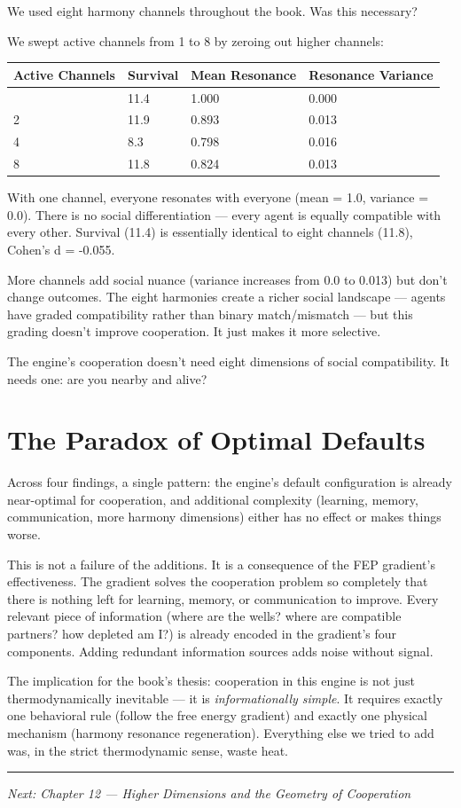 We used eight harmony channels throughout the book. Was this necessary?

We swept active channels from 1 to 8 by zeroing out higher channels:

\begin{longtable}[]{@{}llll@{}}
\toprule\noalign{}
Active Channels & Survival & Mean Resonance & Resonance Variance \\
\midrule\noalign{}
\endhead
\bottomrule\noalign{}
\endlastfoot
1 & 11.4 & 1.000 & 0.000 \\
2 & 11.9 & 0.893 & 0.013 \\
4 & 8.3 & 0.798 & 0.016 \\
8 & 11.8 & 0.824 & 0.013 \\
\end{longtable}

With one channel, everyone resonates with everyone (mean = 1.0, variance = 0.0). There is no social differentiation --- every agent is equally compatible with every other. Survival (11.4) is essentially identical to eight channels (11.8), Cohen's d = -0.055.

More channels add social nuance (variance increases from 0.0 to 0.013) but don't change outcomes. The eight harmonies create a richer social landscape --- agents have graded compatibility rather than binary match/mismatch --- but this grading doesn't improve cooperation. It just makes it more selective.

The engine's cooperation doesn't need eight dimensions of social compatibility. It needs one: are you nearby and alive?

\section{The Paradox of Optimal Defaults}\label{the-paradox-of-optimal-defaults}

Across four findings, a single pattern: the engine's default configuration is already near-optimal for cooperation, and additional complexity (learning, memory, communication, more harmony dimensions) either has no effect or makes things worse.

This is not a failure of the additions. It is a consequence of the FEP gradient's effectiveness. The gradient solves the cooperation problem so completely that there is nothing left for learning, memory, or communication to improve. Every relevant piece of information (where are the wells? where are compatible partners? how depleted am I?) is already encoded in the gradient's four components. Adding redundant information sources adds noise without signal.

The implication for the book's thesis: cooperation in this engine is not just thermodynamically inevitable --- it is \emph{informationally simple}. It requires exactly one behavioral rule (follow the free energy gradient) and exactly one physical mechanism (harmony resonance regeneration). Everything else we tried to add was, in the strict thermodynamic sense, waste heat.

\begin{center}\rule{0.5\linewidth}{0.5pt}\end{center}

\emph{Next: Chapter 12 --- Higher Dimensions and the Geometry of Cooperation}
